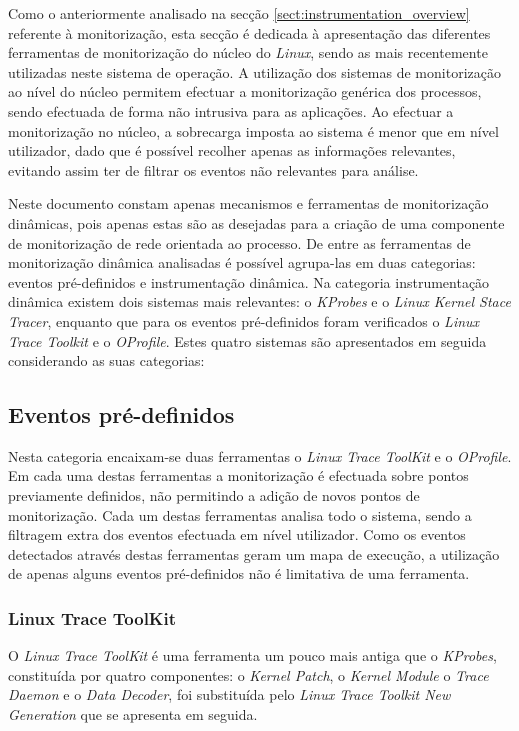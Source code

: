 Como o anteriormente analisado na secção \ref{sect:instrumentation_overview} referente à monitorização, esta secção é dedicada à apresentação das diferentes ferramentas de monitorização do núcleo do \textit{Linux}, sendo as mais recentemente utilizadas neste sistema de operação.
A utilização dos sistemas de monitorização ao nível do núcleo permitem efectuar a monitorização genérica dos processos, sendo efectuada de forma não intrusiva para as aplicações.
Ao efectuar a monitorização no núcleo, a sobrecarga imposta ao sistema é menor que em nível utilizador, dado que é possível recolher apenas as informações relevantes, evitando assim ter de filtrar os eventos não relevantes para análise.

Neste documento constam apenas mecanismos e ferramentas de monitorização dinâmicas, pois apenas estas são as desejadas para a criação de uma componente de monitorização de rede orientada ao processo.
De entre as ferramentas de monitorização dinâmica analisadas é possível agrupa-las em duas categorias: eventos pré-definidos e instrumentação dinâmica.
Na categoria instrumentação dinâmica existem dois sistemas mais relevantes: o \textit{KProbes} e o \textit{Linux Kernel Stace Tracer}, enquanto que para os eventos pré-definidos foram verificados o \textit{Linux Trace Toolkit} e o \textit{OProfile}.
Estes quatro sistemas são apresentados em seguida considerando as suas categorias:

\subsection{Eventos pré-definidos}

Nesta categoria encaixam-se duas ferramentas o \textit{Linux Trace ToolKit} e o \textit{OProfile}.
Em cada uma destas ferramentas a monitorização é efectuada sobre pontos previamente definidos, não permitindo a adição de novos pontos de monitorização.
Cada um destas ferramentas analisa todo o sistema, sendo a filtragem extra dos eventos efectuada em nível utilizador.
Como os eventos detectados através destas ferramentas geram um mapa de execução, a utilização de apenas alguns eventos pré-definidos não é limitativa de uma ferramenta.

\subsubsection{Linux Trace ToolKit}\label{cap:linux_trace_toolkit_overview}

O \textit{Linux Trace ToolKit} é uma ferramenta um pouco mais antiga que o \textit{KProbes}, constituída por quatro componentes: o \textit{Kernel Patch}, o \textit{Kernel Module} o \textit{Trace Daemon} e o \textit{Data Decoder}, foi substituída pelo \textit{Linux Trace Toolkit New Generation} que se apresenta em seguida.


